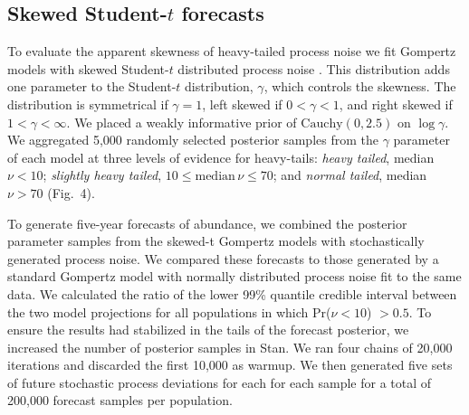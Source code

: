 \documentclass[9pt,twocolumn,twoside]{pnas-new}
\begin{document}
{\subsection{Skewed Student-$t$ forecasts} To evaluate the apparent skewness
of heavy-tailed process noise we fit Gompertz models with skewed Student-$t$
distributed process noise \cite{fernandez1998}. This distribution adds one
parameter to the Student-$t$ distribution, \(\gamma\), which controls the
skewness. The distribution is symmetrical if \(\gamma = 1\), left skewed if \(0
< \gamma < 1\), and right skewed if \(1 < \gamma < \infty\). We placed a weakly
informative prior of \(\mathrm{Cauchy}(0, 2.5)\) on \(\log \gamma\). We
aggregated 5,000 randomly selected posterior samples from the \(\gamma\)
parameter of each model at three levels of evidence for heavy-tails:
\emph{heavy tailed}, median \(\nu < 10\); \emph{slightly heavy tailed}, \(10 \le
\mathrm{median}\, \nu \le 70\); and \emph{normal tailed}, median \(\nu > 70\)
(Fig.~4).

To generate five-year forecasts of abundance, we combined the posterior
parameter samples from the skewed-t Gompertz models with stochastically
generated process noise. We compared these forecasts to those generated by a
standard Gompertz model with normally distributed process noise fit to the same
data. We calculated the ratio of the lower 99\% quantile credible interval
between the two model projections for all populations in which Pr(\(\nu < 10\))
\(> 0.5\). To ensure the results had stabilized in the tails of the forecast
posterior, we increased the number of posterior samples in Stan. We ran four
chains of 20,000 iterations and discarded the first 10,000 as warmup.
We then generated five sets of future stochastic
process deviations for each for each sample
for a total of 200,000 forecast samples per population.

}

\showmatmethods %

\end{document}
